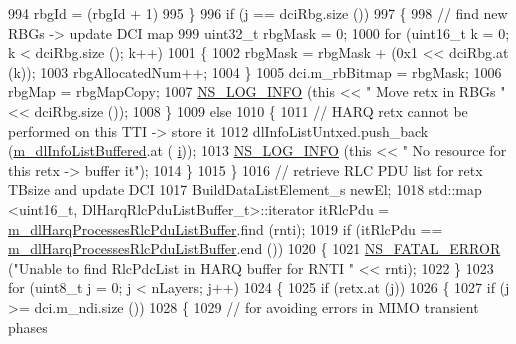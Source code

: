 \begin{DoxyCode}
994                   rbgId = (rbgId + 1) %
995                 \}
996               \textcolor{keywordflow}{if} (j == dciRbg.size ())
997                 \{
998                   \textcolor{comment}{// find new RBGs -> update DCI map}
999                   uint32\_t rbgMask = 0;
1000                   \textcolor{keywordflow}{for} (uint16\_t k = 0; k < dciRbg.size (); k++)
1001                     \{
1002                       rbgMask = rbgMask + (0x1 << dciRbg.at (k));
1003                       rbgAllocatedNum++;
1004                     \}
1005                   dci.m\_rbBitmap = rbgMask;
1006                   rbgMap = rbgMapCopy;
1007                   \hyperlink{group__logging_gafbd73ee2cf9f26b319f49086d8e860fb}{NS\_LOG\_INFO} (\textcolor{keyword}{this} << \textcolor{stringliteral}{" Move retx in RBGs "} << dciRbg.size ());
1008                 \}
1009               \textcolor{keywordflow}{else}
1010                 \{
1011                   \textcolor{comment}{// HARQ retx cannot be performed on this TTI -> store it}
1012                   dlInfoListUntxed.push\_back (\hyperlink{classns3_1_1FdTbfqFfMacScheduler_a72f4bdca7a08fcc26b1618bb9e2d0cf3}{m\_dlInfoListBuffered}.at (
      \hyperlink{bernuolliDistribution_8m_a6f6ccfcf58b31cb6412107d9d5281426}{i}));
1013                   \hyperlink{group__logging_gafbd73ee2cf9f26b319f49086d8e860fb}{NS\_LOG\_INFO} (\textcolor{keyword}{this} << \textcolor{stringliteral}{" No resource for this retx -> buffer it"});
1014                 \}
1015             \}
1016           \textcolor{comment}{// retrieve RLC PDU list for retx TBsize and update DCI}
1017           BuildDataListElement\_s newEl;
1018           std::map <uint16\_t, DlHarqRlcPduListBuffer\_t>::iterator itRlcPdu =  
      \hyperlink{classns3_1_1FdTbfqFfMacScheduler_ac885f8c49550f861905b5e790e346d7b}{m\_dlHarqProcessesRlcPduListBuffer}.find (rnti);
1019           \textcolor{keywordflow}{if} (itRlcPdu == \hyperlink{classns3_1_1FdTbfqFfMacScheduler_ac885f8c49550f861905b5e790e346d7b}{m\_dlHarqProcessesRlcPduListBuffer}.end ())
1020             \{
1021               \hyperlink{group__fatal_ga5131d5e3f75d7d4cbfd706ac456fdc85}{NS\_FATAL\_ERROR} (\textcolor{stringliteral}{"Unable to find RlcPdcList in HARQ buffer for RNTI "} << rnti);
1022             \}
1023           \textcolor{keywordflow}{for} (uint8\_t j = 0; j < nLayers; j++)
1024             \{
1025               \textcolor{keywordflow}{if} (retx.at (j))
1026                 \{
1027                   \textcolor{keywordflow}{if} (j >= dci.m\_ndi.size ())
1028                     \{
1029                       \textcolor{comment}{// for avoiding errors in MIMO transient phases}

\end{DoxyCode}

